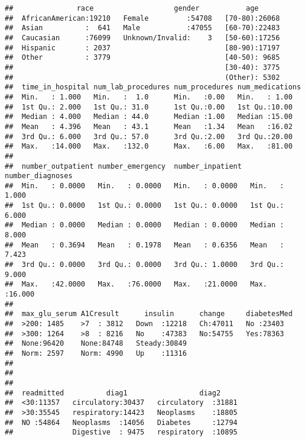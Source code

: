 \documentclass[]{article}
\begin{document}
\begin{verbatim}
##               race                   gender           age       
##  AfricanAmerican:19210   Female         :54708   [70-80):26068  
##  Asian          :  641   Male           :47055   [60-70):22483  
##  Caucasian      :76099   Unknown/Invalid:    3   [50-60):17256  
##  Hispanic       : 2037                           [80-90):17197  
##  Other          : 3779                           [40-50): 9685  
##                                                  [30-40): 3775  
##                                                  (Other): 5302  
##  time_in_hospital num_lab_procedures num_procedures num_medications
##  Min.   : 1.000   Min.   :  1.0      Min.   :0.00   Min.   : 1.00  
##  1st Qu.: 2.000   1st Qu.: 31.0      1st Qu.:0.00   1st Qu.:10.00  
##  Median : 4.000   Median : 44.0      Median :1.00   Median :15.00  
##  Mean   : 4.396   Mean   : 43.1      Mean   :1.34   Mean   :16.02  
##  3rd Qu.: 6.000   3rd Qu.: 57.0      3rd Qu.:2.00   3rd Qu.:20.00  
##  Max.   :14.000   Max.   :132.0      Max.   :6.00   Max.   :81.00  
##                                                                    
##  number_outpatient number_emergency  number_inpatient  number_diagnoses
##  Min.   : 0.0000   Min.   : 0.0000   Min.   : 0.0000   Min.   : 1.000  
##  1st Qu.: 0.0000   1st Qu.: 0.0000   1st Qu.: 0.0000   1st Qu.: 6.000  
##  Median : 0.0000   Median : 0.0000   Median : 0.0000   Median : 8.000  
##  Mean   : 0.3694   Mean   : 0.1978   Mean   : 0.6356   Mean   : 7.423  
##  3rd Qu.: 0.0000   3rd Qu.: 0.0000   3rd Qu.: 1.0000   3rd Qu.: 9.000  
##  Max.   :42.0000   Max.   :76.0000   Max.   :21.0000   Max.   :16.000  
##                                                                        
##  max_glu_serum A1Cresult      insulin      change     diabetesMed
##  >200: 1485    >7  : 3812   Down  :12218   Ch:47011   No :23403  
##  >300: 1264    >8  : 8216   No    :47383   No:54755   Yes:78363  
##  None:96420    None:84748   Steady:30849                         
##  Norm: 2597    Norm: 4990   Up    :11316                         
##                                                                  
##                                                                  
##                                                                  
##  readmitted          diag1                 diag2      
##  <30:11357   circulatory:30437   circulatory  :31881  
##  >30:35545   respiratory:14423   Neoplasms    :18805  
##  NO :54864   Neoplasms  :14056   Diabetes     :12794  
##              Digestive  : 9475   respiratory  :10895  

\end{verbatim}
\end{document}
